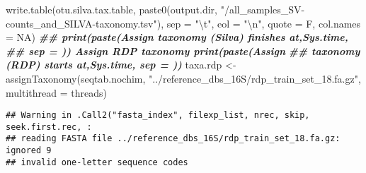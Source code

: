 \documentclass[
]{article}
\newenvironment{Shaded}{\begin{snugshade}}{\end{snugshade}}
\newcommand{\AttributeTok}[1]{\textcolor[rgb]{0.77,0.63,0.00}{#1}}
\newcommand{\ConstantTok}[1]{\textcolor[rgb]{0.00,0.00,0.00}{#1}}
\newcommand{\DocumentationTok}[1]{\textcolor[rgb]{0.56,0.35,0.01}{\textbf{\textit{#1}}}}
\newcommand{\FunctionTok}[1]{\textcolor[rgb]{0.00,0.00,0.00}{#1}}
\newcommand{\NormalTok}[1]{#1}
\newcommand{\OtherTok}[1]{\textcolor[rgb]{0.56,0.35,0.01}{#1}}
\newcommand{\SpecialCharTok}[1]{\textcolor[rgb]{0.00,0.00,0.00}{#1}}
\newcommand{\StringTok}[1]{\textcolor[rgb]{0.31,0.60,0.02}{#1}}
\begin{document}
\begin{Shaded}
\begin{Highlighting}[]
\FunctionTok{write.table}\NormalTok{(otu.silva.tax.table, }\FunctionTok{paste0}\NormalTok{(output.dir, }\StringTok{"/all\_samples\_SV{-}counts\_and\_SILVA{-}taxonomy.tsv"}\NormalTok{), }
    \AttributeTok{sep =} \StringTok{"}\SpecialCharTok{\textbackslash{}t}\StringTok{"}\NormalTok{, }\AttributeTok{eol =} \StringTok{"}\SpecialCharTok{\textbackslash{}n}\StringTok{"}\NormalTok{, }\AttributeTok{quote =}\NormalTok{ F, }\AttributeTok{col.names =} \ConstantTok{NA}\NormalTok{)}
\DocumentationTok{\#\# print(paste(\textquotesingle{}Assign taxonomy (Silva) finishes at\textquotesingle{},Sys.time,}
\DocumentationTok{\#\# sep = \textquotesingle{} \textquotesingle{})) Assign RDP taxonomy print(paste(\textquotesingle{}Assign}
\DocumentationTok{\#\# taxonomy (RDP) starts at\textquotesingle{},Sys.time, sep = \textquotesingle{} \textquotesingle{}))}
\NormalTok{taxa.rdp }\OtherTok{\textless{}{-}} \FunctionTok{assignTaxonomy}\NormalTok{(seqtab.nochim, }\StringTok{"../reference\_dbs\_16S/rdp\_train\_set\_18.fa.gz"}\NormalTok{, }
    \AttributeTok{multithread =}\NormalTok{ threads)}
\end{Highlighting}
\end{Shaded}

\begin{verbatim}
## Warning in .Call2("fasta_index", filexp_list, nrec, skip, seek.first.rec, :
## reading FASTA file ../reference_dbs_16S/rdp_train_set_18.fa.gz: ignored 9
## invalid one-letter sequence codes
\end{verbatim}
\end{document}
